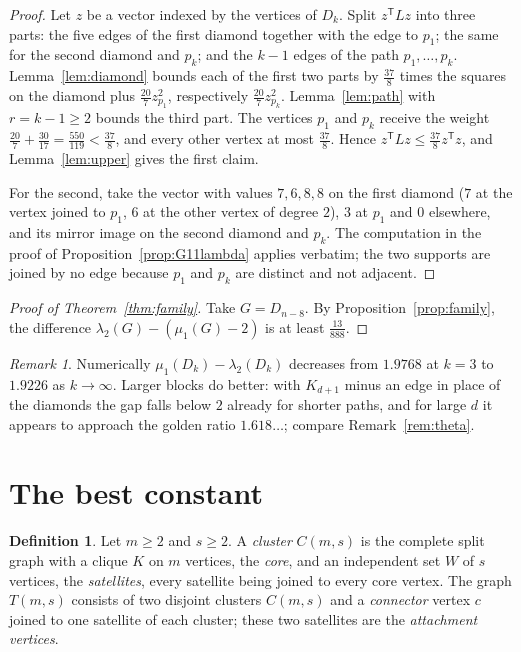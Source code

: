 \documentclass[11pt]{amsart}
\theoremstyle{definition}
\newtheorem{definition}[theorem]{Definition}
\theoremstyle{remark}
\newtheorem{remark}[theorem]{Remark}
\newcommand{\tr}{^{\mathsf{T}}}
\begin{document}
\begin{proof}
Let $z$ be a vector indexed by the vertices of $D_k$. Split $z\tr Lz$ into three parts: the five
edges of the first diamond together with the edge to $p_1$; the same for the second diamond and
$p_k$; and the $k-1$ edges of the path $p_1,\dots,p_k$. Lemma~\ref{lem:diamond} bounds each of
the first two parts by $\frac{37}{8}$ times the squares on the diamond plus $\frac{20}{7}z_{p_1}^2$,
respectively $\frac{20}{7}z_{p_k}^2$. Lemma~\ref{lem:path} with $r=k-1\ge2$ bounds the third
part. The vertices $p_1$ and $p_k$ receive the weight
$\frac{20}{7}+\frac{30}{17}=\frac{550}{119}<\frac{37}{8}$, and every other vertex at most
$\frac{37}{8}$. Hence $z\tr Lz\le\frac{37}{8}z\tr z$, and Lemma~\ref{lem:upper} gives the first
claim.

For the second, take the vector with values $7,6,8,8$ on the first diamond ($7$ at the vertex
joined to $p_1$, $6$ at the other vertex of degree $2$), $3$ at $p_1$ and $0$ elsewhere, and its
mirror image on the second diamond and $p_k$. The computation in the proof of
Proposition~\ref{prop:G11lambda} applies verbatim; the two supports are joined by no edge
because $p_1$ and $p_k$ are distinct and not adjacent.
\end{proof}

\begin{proof}[Proof of Theorem~\ref{thm:family}]
Take $G=D_{n-8}$. By Proposition~\ref{prop:family}, the difference
$\lambda_2(G)-(\mu_1(G)-2)$ is at least $\frac{13}{888}$.
\end{proof}

\begin{remark}
Numerically $\mu_1(D_k)-\lambda_2(D_k)$ decreases from $1.9768$ at $k=3$ to $1.9226$ as
$k\to\infty$. Larger blocks do better: with $K_{d+1}$ minus an edge in place of the diamonds the
gap falls below $2$ already for shorter paths, and for large $d$ it appears to approach the
golden ratio $1.618\ldots$; compare Remark~\ref{rem:theta}.
\end{remark}

\section{The best constant}\label{sec:sharp}

\begin{definition}
Let $m\ge2$ and $s\ge2$. A \emph{cluster} $C(m,s)$ is the complete split graph with a clique
$K$ on $m$ vertices, the \emph{core}, and an independent set $W$ of $s$ vertices, the
\emph{satellites}, every satellite being joined to every core vertex. The graph $T(m,s)$
consists of two disjoint clusters $C(m,s)$ and a \emph{connector} vertex $c$ joined to one
satellite of each cluster; these two satellites are the \emph{attachment vertices}.
\end{definition}
\end{document}
